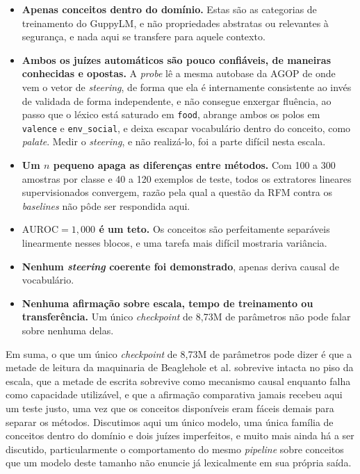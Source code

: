 \begin{itemize}
  \item \textbf{Apenas conceitos dentro do domínio.} Estas são as categorias de treinamento
  do GuppyLM, e não propriedades abstratas ou relevantes à segurança, e nada aqui se
  transfere para aquele contexto.
  \item \textbf{Ambos os juízes automáticos são pouco confiáveis, de maneiras conhecidas e
  opostas.} A \textit{probe} lê a mesma autobase da AGOP de onde vem o vetor de
  \textit{steering}, de forma que ela é internamente consistente ao invés de validada de forma
  independente, e não consegue enxergar fluência, ao passo que o léxico está saturado em
  \verb|food|, abrange ambos os polos em \verb|valence| e \verb|env_social|, e deixa escapar
  vocabulário dentro do conceito, como \emph{palate}. Medir o \textit{steering}, e não
  realizá-lo, foi a parte difícil nesta escala.
  \item \textbf{Um $n$ pequeno apaga as diferenças entre métodos.} Com 100 a 300 amostras
  por classe e 40 a 120 exemplos de teste, todos os extratores lineares supervisionados
  convergem, razão pela qual a questão da RFM contra os \textit{baselines} não pôde ser
  respondida aqui.
  \item \textbf{$\mathrm{AUROC} = 1{,}000$ é um teto.} Os conceitos são perfeitamente
  separáveis linearmente nesses blocos, e uma tarefa mais difícil mostraria variância.
  \item \textbf{Nenhum \textit{steering} coerente foi demonstrado}, apenas deriva causal de
  vocabulário.
  \item \textbf{Nenhuma afirmação sobre escala, tempo de treinamento ou transferência.} Um
  único \textit{checkpoint} de 8{,}73M de parâmetros não pode falar sobre nenhuma delas.
\end{itemize}

Em suma, o que um único \textit{checkpoint} de 8{,}73M de parâmetros pode dizer é que a
metade de leitura da maquinaria de Beaglehole et al. sobrevive intacta no piso da escala,
que a metade de escrita sobrevive como mecanismo causal enquanto falha como capacidade
utilizável, e que a afirmação comparativa jamais recebeu aqui um teste justo, uma vez que
os conceitos disponíveis eram fáceis demais para separar os métodos. Discutimos aqui um
único modelo, uma única família de conceitos dentro do domínio e dois juízes imperfeitos, e
muito mais ainda há a ser discutido, particularmente o comportamento do mesmo
\textit{pipeline} sobre conceitos que um modelo deste tamanho não enuncie já lexicalmente
em sua própria saída.

